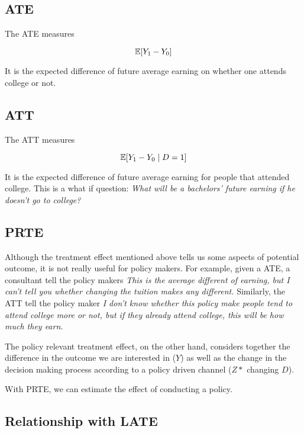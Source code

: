 \subsection{ATE}

The ATE measures

\begin{equation*}
    \operatorname{\mathbb{E}}[Y_1 - Y_0]
\end{equation*}

It is the expected difference of future average earning on whether one attends college or not.

\subsection{ATT}

The ATT measures 

\begin{equation*}
    \operatorname{\mathbb{E}}[Y_1 - Y_0 \mid D=1]
\end{equation*}

It is the expected difference of future average earning for people that attended college. 
This is a what if question: \emph{What will be a bachelors' future earning if he doesn't go to college?}

\subsection{PRTE}

Although the treatment effect mentioned above tells us some aspects of potential outcome, 
it is not really useful for policy makers. For example, given a ATE, a consultant tell the policy makers 
\emph{This is the average different of earning, but I can't tell you whether changing the tuition makes any different.}
Similarly, the ATT tell the policy maker \emph{I don't know whether this policy make people tend to attend college more or not, 
but if they already attend college, this will be how much they earn.}

The policy relevant treatment effect, on the other hand, 
considers together the difference in the outcome we are interested in ($Y$) as well as the 
change in the decision making process according to a policy driven channel ($Z*$ changing $D$). 

With PRTE, we can estimate the effect of conducting a policy. 

\subsection{Relationship with LATE}

